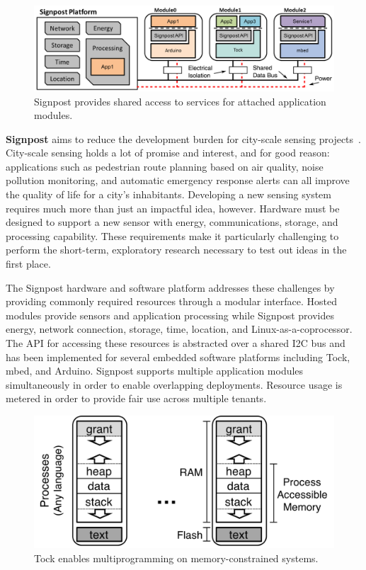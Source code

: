 \documentclass[11pt]{article} %
\begin{document}
\begin{figure}
  \vspace{-1em}
  \centering
  \includegraphics[width=0.59\columnwidth]{signpost_software_revised}
  \caption*{\sffamily \scriptsize
    Signpost provides shared access to services for attached application modules.
  }
  \label{fig:signpost}
  \vspace{-1em}
\end{figure}

\textbf{Signpost} aims to reduce the development burden for city-scale sensing
projects~\cite{adkins18signpost}. City-scale sensing holds a lot of
promise and interest, and for good reason: applications such as pedestrian
route planning based on air quality, noise pollution monitoring, and automatic
emergency response alerts can all improve the quality of life for a city's
inhabitants. Developing a new sensing system requires much more than just an
impactful idea, however. Hardware must be designed to support a new sensor with
energy, communications, storage, and processing capability. These requirements
make it particularly challenging to perform the short-term, exploratory research
necessary to test out ideas in the first place.

The Signpost hardware and software platform addresses these challenges by
providing commonly required resources through a modular interface. Hosted
modules provide sensors and application processing while Signpost provides
energy, network connection, storage, time, location, and
Linux-as-a-coprocessor.
%
The API for accessing these resources is abstracted
over a shared I2C bus and has been implemented for several embedded software
platforms including Tock, mbed, and Arduino.
%
Signpost supports multiple application modules simultaneously in order to
enable overlapping deployments. Resource usage is metered in order to provide
fair use across multiple tenants.

\begin{figure}
  \centering
  \includegraphics[width=0.49\columnwidth]{memory_layout}
  \caption*{\sffamily \scriptsize
   Tock enables multiprogramming on memory-constrained systems.
  }
  \label{fig:tock}
  \vspace{-1em}
\end{figure}
\end{document}
